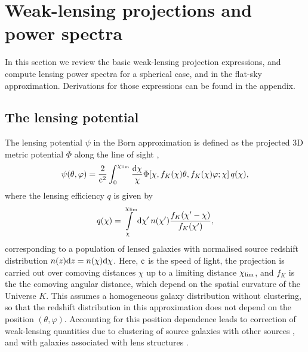 \documentclass[useAMS,usenatbib]{mn2e} %
\begin{document}
\section{Weak-lensing projections and power spectra}
\label{sec:wl}

In this section we review the basic weak-lensing projection expressions, and
compute lensing power spectra for a spherical case, and in the flat-sky
approximation. Derivations for those expressions can be found in the appendix.

\subsection{The lensing potential}
\label{sec:psi}


The lensing potential $\psi$ in the Born approximation is defined as the
projected 3D metric potential $\Phi$ along the line of sight
\citep{1998ApJ...498...26K,BS01},
%
%
\begin{equation}
  \psi(\theta, \varphi) = \frac 2 {{\rm c}^2} \int_0^{\chi_{\rm lim}} \frac{{\rm d}\chi}{\chi}
    \Phi[\chi, f_K(\chi) \theta, f_K(\chi) \varphi; \chi] \, q(\chi),
  \label{eq:psi}
\end{equation}
%
where the lensing efficiency $q$ is given by
%
\begin{equation}
  q(\chi) = \int\limits_\chi^{\chi_{\rm lim}} {\rm d} \chi^\prime \, n(\chi^\prime)
    \frac{f_K(\chi^\prime - \chi)}{f_K(\chi^\prime)},
  \label{eq:lens_efficiency}
\end{equation}
%
corresponding to a population of lensed galaxies with normalised source redshift
distribution $n(z) {\rm d}z = n(\chi) {\rm d} \chi$. Here, ${\rm c}$ is the
speed of light, the projection is carried out over comoving distances $\chi$ up
to a limiting distance $\chi_{\rm lim}$, and $f_K$ is the the comoving angular
distance, which depend on the spatial curvature of the Universe $K$.
%
This assumes a homogeneous galaxy distribution without clustering, so that the
redshift distribution in this approximation does not depend on the position
$(\theta, \varphi)$. Accounting for this position dependence leads to
correction of weak-lensing quantities due to clustering of source galaxies with
other sources \citep{2002A&A...389..729S}, and with galaxies associated with
lens structures \citep{1998A&A...338..375B,H02}.
\end{document}
